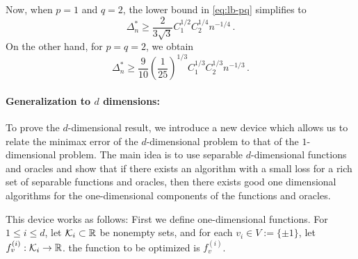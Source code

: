 Now, when $p=1$ and $q=2$, the lower bound in \eqref{eq:lb-pq} simplifies to 
\[
\Delta_n^{*} \ge \dfrac{ 2}{3\sqrt{3}} C_1^{1/2}C_2^{1/4} n^{-1/4} \,.
\]
On the other hand, for $p=q=2$, we obtain 
\[
\Delta_n^{*} \ge  \frac{9}{10}\left(\frac{1}{25}\right)^{1/3}C_1^{1/3}C_2^{1/3} n^{-1/3}\,.
\]

\paragraph{Generalization to $d$ dimensions:}
To prove the $d$-dimensional result, we introduce a new device which allows us to relate the minimax error of the $d$-dimensional problem to that of the $1$-dimensional problem.
The main idea is to use separable $d$-dimensional functions and oracles and show that if there exists an algorithm with a small loss for a rich set of separable functions and oracles, then there exists good one dimensional algorithms for the one-dimensional components of the functions and oracles.

This device works as follows: First we define one-dimensional functions.
For $1\le i \le d$, let $\mathcal{K}_i \subset \mathbb{R}$ be nonempty sets, 
and for each $v_i \in V := \{\pm 1\}$, let $f_v^{(i)}: \mathcal{K}_i \to \mathbb{R}$.
the function to be optimized is $f_v^{(i)}$. 

